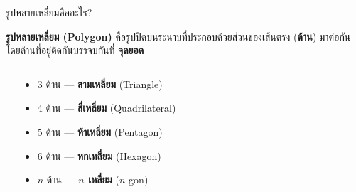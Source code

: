 \documentclass[11pt, aspectratio=169]{beamer}
\begin{document}
\begin{frame}{รูปหลายเหลี่ยมคืออะไร?}
  \begin{explanation}[นิยาม]
    \textbf{รูปหลายเหลี่ยม (Polygon)} คือรูปปิดบนระนาบที่ประกอบด้วยส่วนของเส้นตรง (\textbf{ด้าน})
    มาต่อกัน โดยด้านที่อยู่ติดกันบรรจบกันที่ \textbf{จุดยอด}
  \end{explanation}

  \begin{columns}[T]
      \begin{center}
      \end{center}

      \begin{explanation}
        \begin{itemize}
          \item 3 ด้าน — \textbf{สามเหลี่ยม} (Triangle)
          \item 4 ด้าน — \textbf{สี่เหลี่ยม} (Quadrilateral)
          \item 5 ด้าน — \textbf{ห้าเหลี่ยม} (Pentagon)
          \item 6 ด้าน — \textbf{หกเหลี่ยม} (Hexagon)
          \item $n$ ด้าน — \textbf{$n$ เหลี่ยม} ($n$-gon)
        \end{itemize}
      \end{explanation}
  \end{columns}
\end{frame}
\end{document}
